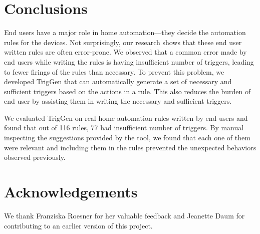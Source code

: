 \documentclass{sig-alternate-05-2015}
\begin{document}
\section{Conclusions}
End users have a major role in home automation---they decide the automation rules for the devices. Not surprisingly, our research shows that these end user written rules are often error-prone.
We observed that a common error made by end users while writing the rules is having insufficient number of triggers, leading to fewer firings of the rules than necessary. To prevent this problem, we developed TrigGen that can automatically generate a set of necessary and sufficient triggers based on the actions in a rule. This also reduces the burden of end user by assisting them in writing the necessary and sufficient triggers. 

We evaluated TrigGen on real home automation rules written by end users and found that out of 116 rules, 77 had insufficient number of triggers. By manual inspecting the suggestions provided by the tool, we found that each one of them were relevant and including them in the rules prevented the unexpected behaviors observed previously. 


\section{Acknowledgements}
We thank Franziska Roesner for her valuable feedback and Jeanette Daum for contributing to an earlier version of this project.

  
\end{document}

